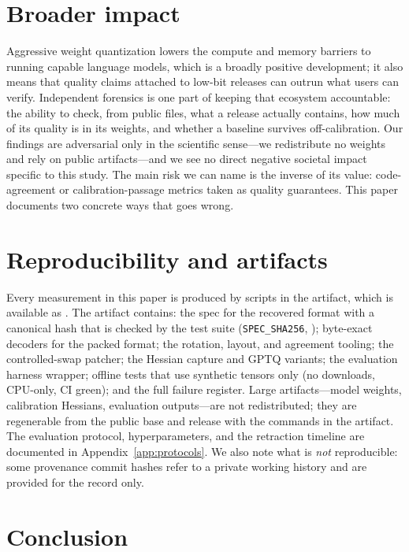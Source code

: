 \section{Broader impact}
\label{sec:impact}

Aggressive weight quantization lowers the compute and memory barriers to
running capable language models, which is a broadly positive development; it
also means that quality claims attached to low-bit releases can outrun what
users can verify. Independent forensics is one part of keeping that ecosystem
accountable: the ability to check, from public files, what a release actually
contains, how much of its quality is in its weights, and whether a baseline
survives off-calibration. Our findings are adversarial only in the scientific
sense---we redistribute no weights and rely on public artifacts---and we see no
direct negative societal impact specific to this study. The main risk we can
name is the inverse of its value: code-agreement or calibration-passage metrics
taken as quality guarantees. This paper documents two concrete ways that goes
wrong.

\section{Reproducibility and artifacts}
\label{sec:repro}

Every measurement in this paper is produced by scripts in the artifact, which
is available as \coderef{}. The artifact contains: the spec for the recovered
format with a canonical hash that is checked by the test suite
(\texttt{SPEC\_SHA256}, ); byte-exact decoders for the
packed format; the rotation, layout, and agreement tooling; the controlled-swap
patcher; the Hessian capture and GPTQ variants; the evaluation harness wrapper;
offline tests that use synthetic tensors only (no downloads, CPU-only, CI
green); and the full failure register. Large artifacts---model weights,
calibration Hessians, evaluation outputs---are not redistributed; they are
regenerable from the public base and release with the commands in the artifact.
The evaluation protocol, hyperparameters, and the retraction timeline are
documented in Appendix~\ref{app:protocols}. We also note what is \emph{not}
reproducible: some provenance commit hashes refer to a private working history
and are provided for the record only.

\section{Conclusion}
\label{sec:conclusion}

